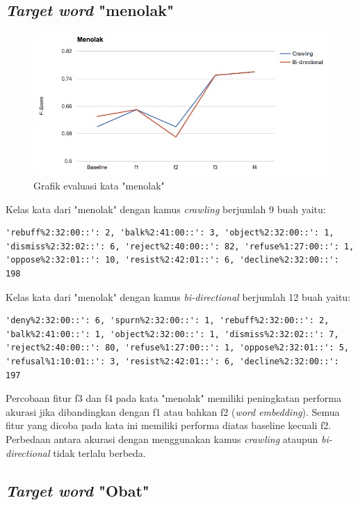 \subsection{\textit{Target word} "menolak"}

\begin{figure}
	\centering
	\includegraphics[width=1\linewidth]{adit_pics/menolak.png}
	\caption{Grafik evaluasi kata "menolak"}
	\label{fig:menolak}
\end{figure}


Kelas kata dari "menolak" dengan kamus \textit{crawling} berjumlah 9 buah yaitu:
\begin{lstlisting}
'rebuff%2:32:00::': 2, 'balk%2:41:00::': 3, 'object%2:32:00::': 1, 'dismiss%2:32:02::': 6, 'reject%2:40:00::': 82, 'refuse%1:27:00::': 1, 'oppose%2:32:01::': 10, 'resist%2:42:01::': 6, 'decline%2:32:00::': 198
\end{lstlisting}
Kelas kata dari "menolak" dengan kamus \textit{bi-directional} berjumlah 12 buah yaitu:
\begin{lstlisting}
'deny%2:32:00::': 6, 'spurn%2:32:00::': 1, 'rebuff%2:32:00::': 2, 'balk%2:41:00::': 1, 'object%2:32:00::': 1, 'dismiss%2:32:02::': 7, 'reject%2:40:00::': 80, 'refuse%1:27:00::': 1, 'oppose%2:32:01::': 5, 'refusal%1:10:01::': 3, 'resist%2:42:01::': 6, 'decline%2:32:00::': 197
\end{lstlisting}

Percobaan fitur f3 dan f4 pada kata "menolak" memiliki peningkatan performa akurasi jika dibandingkan dengan f1 atau bahkan f2 (\textit{word embedding}). Semua fitur yang dicoba pada kata ini memiliki performa diatas baseline kecuali f2. Perbedaan antara akurasi dengan menggunakan kamus \textit{crawling} ataupun \textit{bi-directional} tidak terlalu berbeda.

\subsection{\textit{Target word} "Obat"}

